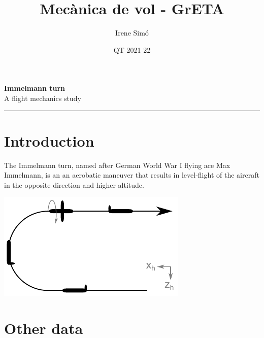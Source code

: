 \documentclass[10pt, twoside]{report}
\title{Mecànica de vol - GrETA}
\author{Irene Simó}
\date{QT 2021-22}
\begin{document}
\thispagestyle{empty} 
	\begin{center}
	\LARGE \textbf{Immelmann turn}\\
	\Large A flight mechanics study
	
	\vspace{1cm}	
	\hrule
	\end{center}
	
	\normalsize
	\begin{multicols}{2}
	\vspace*{-2cm}
	\tableofcontents
	\section*{Introduction}
	The Immelmann turn, named after German World War I flying ace Max Immelmann, is an an  aerobatic maneuver that results in level-flight of the aircraft in the opposite direction and higher altitude.
	
		\includegraphics[width=\linewidth]{figures/immelmann-overview}
		\vspace*{0.5cm}
	
	\lipsum[1-2]
	
		
	
	\section*{Other data}
	\end{multicols}
\end{document}
